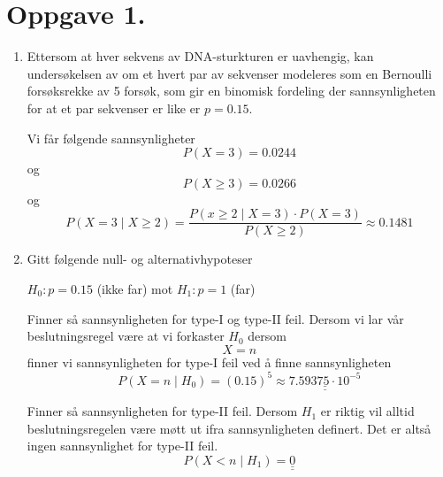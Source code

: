 \documentclass[a4paper,11pt,norsk]{article}
\begin{document}


\section*{Oppgave 1.}
\begin{enumerate}
    \item Ettersom at hver sekvens av DNA-sturkturen er uavhengig, kan 
        undersøkelsen av om et hvert par av sekvenser modeleres som en 
        Bernoulli forsøksrekke av 5 forsøk, som gir en binomisk fordeling
        der sannsynligheten for at et par sekvenser er like er $p = 0.15$.

        Vi får følgende sannsynligheter
        \[
            P(X = 3) = 0.0244
        \]
        og
        \[
            P(X \geq 3) = 0.0266 
        \]
        og
        \[
            P(X = 3 \mid X \geq 2) = \frac{P(x \geq 2 \mid X = 3) \cdot P(X = 3)}{P(X \geq 2)} \approx 0.1481
        \]
    \item Gitt følgende null- og alternativhypoteser
        \begin{center}
            $H_0: p = 0.15$ (ikke far) mot $H_1: p = 1$ (far)
        \end{center}
        Finner så sannsynligheten for type-I og type-II feil. Dersom vi lar vår 
        beslutningsregel være at vi forkaster $H_0$ dersom 
        \[
            X = n
        \]
        finner vi sannsynligheten for type-I feil ved å finne sannsynligheten
        \[
            P(X = n \mid H_0) = (0.15)^{5} \approx \underline{\underline{7.59375 \cdot 10^{-5}}}
        \]
        
        Finner så sannsynligheten for type-II feil. Dersom $H_1$ er riktig vil alltid 
        beslutningsregelen være møtt ut ifra sannsynligheten definert. Det er altså 
        ingen sannsynlighet for type-II feil.
        \[
            P(X < n \mid H_1) = \underline{\underline{0}}
        \]
\end{enumerate}
\end{document}

